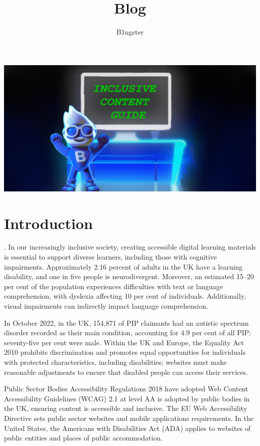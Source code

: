 \documentclass{article}
\title{Blog}
\author{B1ngster}
\date{}
\begin{document}
\begin{titlepage}

        \vskip2cm
        
    \includegraphics[width=14cm]{images/Bingster_inclusive_img.png} %
    \vfill
    \vfill
\end{titlepage}


\newpage


\tableofcontents
\newpage

\section{Introduction}
. 
In our increasingly inclusive society, creating accessible digital learning materials is essential to support diverse learners, including those with cognitive impairments. Approximately 2.16 percent of adults in the UK have a learning disability, and one in five people is neurodivergent. Moreover, an estimated 15–20 per cent of the population experiences difficulties with text or language comprehension, with dyslexia affecting 10 per cent of individuals. Additionally, visual impairments can indirectly impact language comprehension.

In October 2022, in the UK,  154,871 of PIP claimants had an autistic spectrum disorder recorded as their main condition, accounting for 4.9 per cent of all PIP; seventy-five per cent were male. Within the UK and Europe, the Equality Act 2010 prohibits discrimination and promotes equal opportunities for individuals with protected characteristics, including disabilities; websites must make reasonable adjustments to ensure that disabled people can access their services. 

Public Sector Bodies Accessibility Regulations 2018 have adopted Web Content Accessibility Guidelines (WCAG) 2.1 at level AA is adopted by public bodies in the UK, ensuring content is accessible and inclusive. The EU Web Accessibility Directive sets public sector websites and mobile applications requirements. In the United States, the Americans with Disabilities Act (ADA) applies to websites of public entities and places of public accommodation. 
\end{document}
